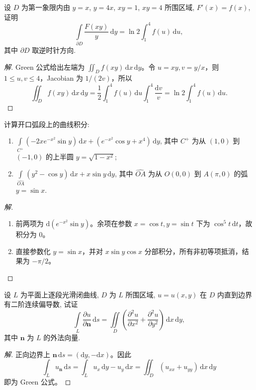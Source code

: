 \documentclass[../../数学分析培优讲义(答案版).tex]{subfiles}
\begin{document}
\begin{example}
设 $D$ 为第一象限内由 $y=x$, $y=4x$, $xy=1$, $xy=4$ 所围区域, $F'(x)=f(x)$, 证明
\[
    \int\limits_{\partial D}\dfrac{F(xy)}{y}\,\mathrm{d}y
    =\ln2\int_1^4f(u)\,\mathrm{d}u,
\]
其中 $\partial D$ 取逆时针方向.
\end{example}

\begin{proof}[解]
Green 公式给出左端为 $\iint_Df(xy)\,\mathrm{d}x\,\mathrm{d}y$。令 $u=xy,v=y/x$，则 $1\leq u,v\leq4$，Jacobian 为 $1/(2v)$，所以
\[
\iint_Df(xy)\,\mathrm{d}x\,\mathrm{d}y
=\dfrac{1}{2}\int_1^4f(u)\,\mathrm{d}u\int_1^4\dfrac{\mathrm{d}v}{v}
=\ln2\int_1^4f(u)\,\mathrm{d}u.
\]
\end{proof}

\begin{example}
计算开口弧段上的曲线积分:
\begin{enumerate}[label=(\arabic*)]
    \item $\displaystyle\int\limits_{C^+}(-2xe^{-x^2}\sin y)\,\mathrm{d}x+(e^{-x^2}\cos y+x^4)\,\mathrm{d}y$, 其中 $C^+$ 为从 $(1,0)$ 到 $(-1,0)$ 的上半圆 $y=\sqrt{1-x^2}$;
    \item $\displaystyle\int\limits_{\widehat{OA}}(y^2-\cos y)\,\mathrm{d}x+x\sin y\,\mathrm{d}y$, 其中 $\widehat{OA}$ 为从 $O(0,0)$ 到 $A(\pi,0)$ 的弧 $y=\sin x$.
\end{enumerate}
\end{example}

\begin{proof}[解]
\begin{enumerate}[label=(\arabic*)]
\item 前两项为 $\mathrm{d}(e^{-x^2}\sin y)$。余项在参数 $x=\cos t,y=\sin t$ 下为 $\cos^5t\,\mathrm{d}t$，故积分为 $0$。
\item 直接参数化 $y=\sin x$，并对 $x\sin y\cos x$ 分部积分，所有非初等项抵消，结果为 $-\pi/2$。
\end{enumerate}
\end{proof}

\begin{example}
设 $L$ 为平面上逐段光滑闭曲线, $D$ 为 $L$ 所围区域, $u=u(x,y)$ 在 $D$ 内直到边界有二阶连续偏导数, 试证
\[
    \int\limits_L\dfrac{\partial u}{\partial\bm n}\,\mathrm{d}s
    =\iint\limits_D\left(\dfrac{\partial^2u}{\partial x^2}+\dfrac{\partial^2u}{\partial y^2}\right)\,\mathrm{d}x\,\mathrm{d}y,
\]
其中 $\bm n$ 为 $L$ 的外法向量.
\end{example}

\begin{proof}[解]
正向边界上 $\bm n\,\mathrm{d}s=(\mathrm{d}y,-\mathrm{d}x)$。因此
\[
\int_Lu_{\bm n}\,\mathrm{d}s=\int_Lu_x\,\mathrm{d}y-u_y\,\mathrm{d}x
=\iint_D(u_{xx}+u_{yy})\,\mathrm{d}x\,\mathrm{d}y
\]
即为 Green 公式。
\end{proof}
\end{document}

